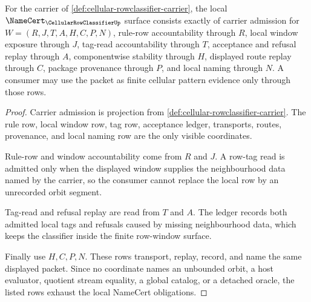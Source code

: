 \begin{theorem}
\label{thm:cellular-rowclassifier-namecert-obligations}
For the carrier of \autoref{def:cellular-rowclassifier-carrier}, the local $\NameCert_{\CellularRowClassifierUp}$ surface consists exactly of carrier admission for $W=(R,J,T,A,H,C,P,N)$, rule-row accountability through $R$, local window exposure through $J$, tag-read accountability through $T$, acceptance and refusal replay through $A$, componentwise stability through $H$, displayed route replay through $C$, package provenance through $P$, and local naming through $N$. A consumer may use the packet as finite cellular pattern evidence only through those rows.
\end{theorem}
\begin{proof}
Carrier admission is projection from \autoref{def:cellular-rowclassifier-carrier}. The rule row, local window row, tag row, acceptance ledger, transports, routes, provenance, and local naming row are the only visible coordinates.

Rule-row and window accountability come from $R$ and $J$. A row-tag read is admitted only when the displayed window supplies the neighbourhood data named by the carrier, so the consumer cannot replace the local row by an unrecorded orbit segment.

Tag-read and refusal replay are read from $T$ and $A$. The ledger records both admitted local tags and refusals caused by missing neighbourhood data, which keeps the classifier inside the finite row-window surface.

Finally use $H,C,P,N$. These rows transport, replay, record, and name the same displayed packet. Since no coordinate names an unbounded orbit, a host evaluator, quotient stream equality, a global catalog, or a detached oracle, the listed rows exhaust the local NameCert obligations.
\end{proof}

